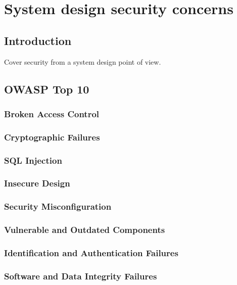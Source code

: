 \documentclass[a4paper, 11pt]{book}
\begin{document}
    \chapter{System design security concerns}

    \section{Introduction}
    Cover security from a system design point of view.

    \section{OWASP Top 10}

    \subsection{Broken Access Control}

    \subsection{Cryptographic Failures}

    \subsection{SQL Injection}

    \subsection{Insecure Design}

    \subsection{Security Misconfiguration}

    \subsection{Vulnerable and Outdated Components}

    \subsection{Identification and Authentication Failures}

    \subsection{Software and Data Integrity Failures}
\end{document}
